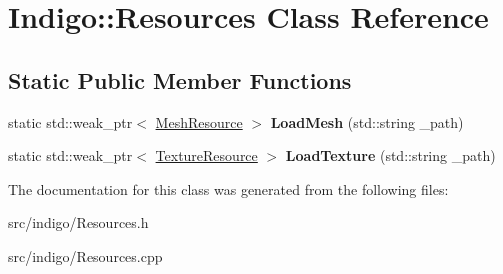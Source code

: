 \hypertarget{class_indigo_1_1_resources}{}\section{Indigo\+:\+:Resources Class Reference}
\label{class_indigo_1_1_resources}
\subsection*{Static Public Member Functions}
\begin{DoxyCompactItemize}
\item 
\mbox{\label{class_indigo_1_1_resources_a22b34571bcf56685cff314cf20f333a8}} 
static std\+::weak\+\_\+ptr$<$ \hyperlink{class_indigo_1_1_mesh_resource}{Mesh\+Resource} $>$ {\bfseries Load\+Mesh} (std\+::string \+\_\+path)
\item 
\mbox{\label{class_indigo_1_1_resources_a53c3ca210d85b35b97d9179c641a7261}} 
static std\+::weak\+\_\+ptr$<$ \hyperlink{class_indigo_1_1_texture_resource}{Texture\+Resource} $>$ {\bfseries Load\+Texture} (std\+::string \+\_\+path)
\end{DoxyCompactItemize}


The documentation for this class was generated from the following files\+:\begin{DoxyCompactItemize}
\item 
src/indigo/Resources.\+h\item 
src/indigo/Resources.\+cpp\end{DoxyCompactItemize}

